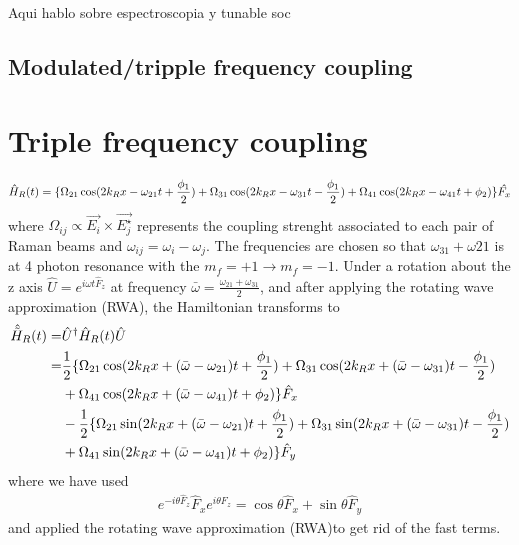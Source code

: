 Aqui hablo sobre espectroscopia y tunable soc

\subsection{Modulated/tripple frequency coupling}


\section{Triple frequency coupling}





%
\begin{align}
\hat{H}_R(t) = \lbrace\Omega_{21}\cos(2{{k_R}} x-\omega_{21} t +\frac{\phi_1}{2})+\Omega_{31}\cos(2{{k_R}} x-\omega_{31} t-\frac{\phi_1}{2})+\Omega_{41}\cos(2{{k_R}} x-\omega_{41} t + \phi_2)\rbrace\hat{F_x}
\end{align}
%
%
where $\Omega_{ij}\propto \vec{E_i}\times\vec{E_j^{\star}}$ represents the coupling strenght associated to each pair of Raman beams and $\omega_{ij} = \omega_{i}-\omega_{j} $. The frequencies are chosen so that $\omega_{31} + \omega{21}$ is at 4 photon resonance with the $m_f = +1\rightarrow m_f = -1$. Under a rotation about the z axis $\hat{U} = e^{i\omega t\hat{F}_z}$ at frequency $\bar{\omega} = \frac{\omega_{21}+\omega_{31}}{2}$, and after applying the rotating wave approximation (RWA), the Hamiltonian transforms to 
%
%
\begin{align}
\begin{split}
\hat{\tilde{H}}_R(t) = & \hat{U}^{\dagger} \hat{H}_R(t)\hat{U} \\
= & \frac{1}{2}\lbrace\Omega_{21}\cos(2{{k_R}} x+(\bar{\omega}-\omega_{21}) t +\frac{\phi_1}{2})+\Omega_{31}\cos(2{{k_R}} x+(\bar{\omega}-\omega_{31}) t -\frac{\phi_1}{2}) \\
& +\Omega_{41}\cos(2{{k_R}} x+(\bar{\omega}-\omega_{41}) t + \phi_2)\rbrace \hat{F}_x \\
& -  \frac{1}{2}\lbrace\Omega_{21}\sin(2{{k_R}} x+(\bar{\omega}-\omega_{21}) t +\frac{\phi_1}{2})+\Omega_{31}\sin(2{{k_R}} x+(\bar{\omega}-\omega_{31}) t-\frac{\phi_1}{2})\\
&+\Omega_{41}\sin(2{{k_R}} x+(\bar{\omega}-\omega_{41}) t+\phi_2)\rbrace \hat{F}_y
\end{split}
\end{align}
%
%
where we have used 
%
\begin{align}
e^{-i\theta \hat{F}_z} \hat{F}_x e^{i\theta \hat{F}_z}= \cos\theta \hat{F}_x + \sin\theta\hat{F}_y
\end{align}
%
and applied the rotating wave approximation (RWA)to get rid of the fast terms. 

